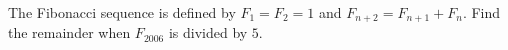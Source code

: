 The Fibonacci sequence is defined by $F_1=F_2=1$ and $F_{n+2}=F_{n+1}+F_n$. Find the remainder when $F_{2006}$ is divided by $5$.
